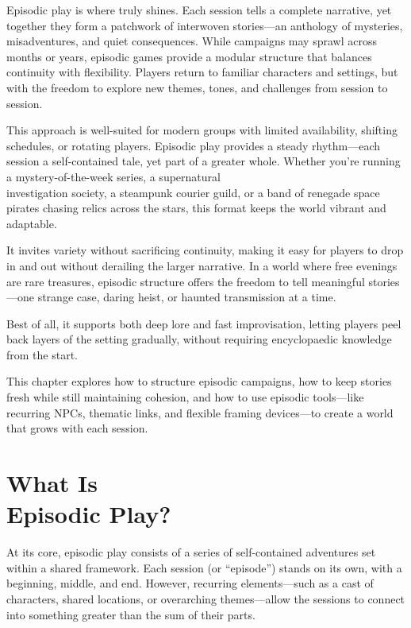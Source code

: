 Episodic play is where \wyrd truly shines. Each session tells a complete narrative, yet together they form a patchwork of interwoven stories—an anthology of mysteries, misadventures, and quiet consequences. While campaigns may sprawl across months or years, episodic games provide a modular structure that balances continuity with flexibility. Players return to familiar characters and settings, but with the freedom to explore new themes, tones, and challenges from session to session.

This approach is well-suited for modern groups with limited availability, shifting schedules, or rotating players. Episodic play provides a steady rhythm—each session a self-contained tale, yet part of a greater whole. Whether you're running a mystery-of-the-week series, a supernatural\\ investigation society, a steampunk courier guild, or a band of renegade space pirates chasing relics across the stars, this format keeps the world vibrant and adaptable.

It invites variety without sacrificing continuity, making it easy for players to drop in and out without derailing the larger narrative. In a world where free evenings are rare treasures, episodic structure offers the freedom to tell meaningful stories—one strange case, daring heist, or haunted transmission at a time.


Best of all, it supports both deep lore and fast improvisation, letting players peel back layers of the setting gradually, without requiring encyclopaedic knowledge from the start.

This chapter explores how to structure episodic campaigns, how to keep stories fresh while still maintaining cohesion, and how to use episodic tools—like recurring NPCs, thematic links, and flexible framing devices—to create a world that grows with each session.

\section[What Is Episodic Play?]{What Is\\ Episodic Play?}

At its core, episodic play consists of a series of self-contained adventures set within a shared framework. Each session (or “episode”) stands on its own, with a beginning, middle, and end. However, recurring elements—such as a cast of characters, shared locations, or overarching themes—allow the sessions to connect into something greater than the sum of their parts.

